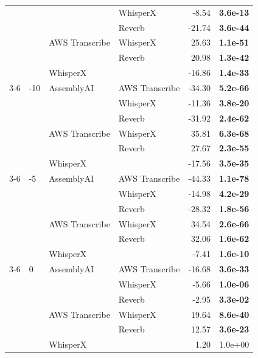 \begin{tabular}{llllrr}
  &   &   & WhisperX & -8.54 & \textbf{ 3.6e-13} \\
  &   &   & Reverb & -21.74 & \textbf{ 3.6e-44} \\
  &   & AWS Transcribe & WhisperX & 25.63 & \textbf{ 1.1e-51} \\
  &   &   & Reverb & 20.98 & \textbf{ 1.3e-42} \\
  &   & WhisperX &   & -16.86 & \textbf{ 1.4e-33} \\
\cmidrule(r){3-6}
  & -10 & AssemblyAI & AWS Transcribe & -34.30 & \textbf{ 5.2e-66} \\
  &   &   & WhisperX & -11.36 & \textbf{ 3.8e-20} \\
  &   &   & Reverb & -31.92 & \textbf{ 2.4e-62} \\
  &   & AWS Transcribe & WhisperX & 35.81 & \textbf{ 6.3e-68} \\
  &   &   & Reverb & 27.67 & \textbf{ 2.3e-55} \\
  &   & WhisperX &   & -17.56 & \textbf{ 3.5e-35} \\
\cmidrule(r){3-6}
  & -5 & AssemblyAI & AWS Transcribe & -44.33 & \textbf{ 1.1e-78} \\
  &   &   & WhisperX & -14.98 & \textbf{ 4.2e-29} \\
  &   &   & Reverb & -28.32 & \textbf{ 1.8e-56} \\
  &   & AWS Transcribe & WhisperX & 34.54 & \textbf{ 2.6e-66} \\
  &   &   & Reverb & 32.06 & \textbf{ 1.6e-62} \\
  &   & WhisperX &   & -7.41 & \textbf{ 1.6e-10} \\
\cmidrule(r){3-6}
  & 0 & AssemblyAI & AWS Transcribe & -16.68 & \textbf{ 3.6e-33} \\
  &   &   & WhisperX & -5.66 & \textbf{ 1.0e-06} \\
  &   &   & Reverb & -2.95 & \textbf{ 3.3e-02} \\
  &   & AWS Transcribe & WhisperX & 19.64 & \textbf{ 8.6e-40} \\
  &   &   & Reverb & 12.57 & \textbf{ 3.6e-23} \\
  &   & WhisperX &   & 1.20 &  1.0e+00 \\
\bottomrule
\end{tabular}

